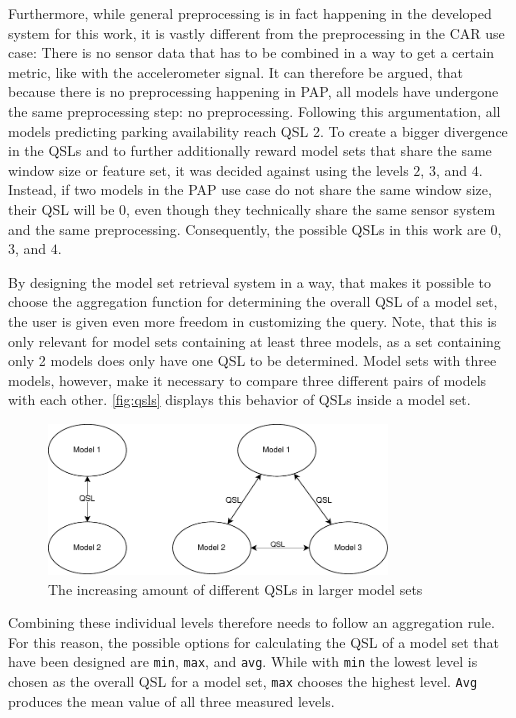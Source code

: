 Furthermore, while general preprocessing is in fact happening in the developed system for this work, it is vastly different from the preprocessing in the CAR use case: There is no sensor data that has to be combined in a way to get a certain metric, like with the accelerometer signal. It can therefore be argued, that because there is no preprocessing happening in PAP, all models have undergone the same preprocessing step: no preprocessing. Following this argumentation, all models predicting parking availability reach QSL 2. To create a bigger divergence in the QSLs and to further additionally reward model sets that share the same window size or feature set, it was decided against using the levels $2$, $3$, and $4$. Instead, if two models in the PAP use case do not share the same window size, their QSL will be $0$, even though they technically share the same sensor system and the same preprocessing. Consequently, the possible QSLs in this work are $0$, $3$, and $4$.

By designing the model set retrieval system in a way, that makes it possible to choose the aggregation function for determining the overall QSL of a model set, the user is given even more freedom in customizing the query. Note, that this is only relevant for model sets containing at least three models, as a set containing only 2 models does only have one QSL to be determined. Model sets with three models, however, make it necessary to compare three different pairs of models with each other. \autoref{fig:qsls} displays this behavior of QSLs inside a model set. 

\begin{figure}[htbp]
  \centering
\includegraphics[height=4cm]{graphics/qsl}
  \caption{The increasing amount of different QSLs in larger model sets}
  \label{fig:qsls}
\end{figure}

Combining these individual levels therefore needs to follow an aggregation rule. For this reason, the possible options for calculating the QSL of a model set that have been designed are \texttt{min}, \texttt{max}, and \texttt{avg}. While with \texttt{min} the lowest level is chosen as the overall QSL for a model set, \texttt{max} chooses the highest level. \texttt{Avg} produces the mean value of all three measured levels.

